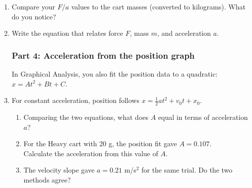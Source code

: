 \documentclass[12pt, twoside]{article}
\begin{document}
\begin{enumerate}[itemsep=0.25cm]
\item Compare your $F/a$ values to the cart masses (converted to kilograms). What do you notice?
  \vspace{2.5cm}

\item Write the equation that relates force $F$, mass $m$, and acceleration $a$.
  \vspace{1.5cm}

\subsubsection*{Part 4: Acceleration from the position graph}

In Graphical Analysis, you also fit the position data to a quadratic: $x = At^2 + Bt + C$.

\item For constant acceleration, position follows $x = \frac{1}{2}at^2 + v_0 t + x_0$.
  \begin{enumerate}[itemsep=1.75cm]
    \item Comparing the two equations, what does $A$ equal in terms of acceleration $a$?
    \item For the Heavy cart with 20 g, the position fit gave $A = 0.107$. \\ Calculate the acceleration from this value of $A$.
    \item The velocity slope gave $a = 0.21$ m/s$^2$ for the same trial. Do the two methods agree?
  \end{enumerate}

\end{enumerate}
\end{document}
